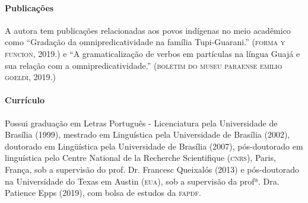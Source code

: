 \documentclass[11pt]{extarticle}
\begin{document}

\paragraph{Publicações}
A autora tem publicações relacionadas aos povos indígenas no meio acadêmico como ``Gradação da omnipredicatividade na família Tupi-Guarani.'' (\textsc{forma y funcion}, 2019.) e ``A gramaticalização de verbos em partículas na língua Guajá e sua relação com a omnipredicatividade.'' (\textsc{boletim do museu paraense emilio goeldi}, 2019.)



\paragraph{Currículo}
Possui graduação em Letras Português - Licenciatura pela Universidade de Brasília (1999), mestrado em Linguística pela Universidade de Brasília (2002), doutorado em Lingüística pela Universidade de Brasília (2007), pós-doutorado em linguística pelo Centre National de la Recherche Scientifique (\textsc{cnrs}), Paris, França, sob a supervisão do prof. Dr. Francesc Queixalós (2013) e pós-doutorado na Universidade do Texas em Austin (\textsc{eua}), sob a supervisão da profª. Dra. Patience Epps (2019), com bolsa de estudos da \textsc{fapdf}. 
\end{document}
